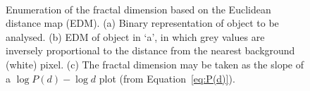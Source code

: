 \begin{figure}[htbp]
	\centering
	\hspace{0.5cm}
	\\
	\captionsetup[subfloat]{position=top}
	\caption{Enumeration of the fractal dimension based on the Euclidean distance map (EDM). (a) Binary representation of object to be analysed. (b) EDM of object in \lq a', in which grey values are inversely proportional to the distance from the nearest background (white) pixel. (c) The fractal dimension may be taken as the slope of a $\log P(d) - \log d$ plot (from Equation~\ref{eq:P(d)}).}
	\label{fig:EDMFrac}
\end{figure}

